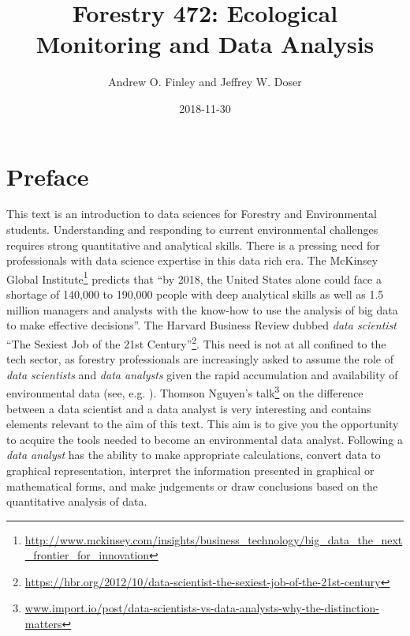 \documentclass[]{krantz}
\title{Forestry 472: Ecological Monitoring and Data Analysis}
\author{Andrew O. Finley and Jeffrey W. Doser}
\date{2018-11-30}
\renewcommand{\href}[2]{#2\footnote{\url{#1}}}
\theoremstyle{definition}
\theoremstyle{definition}
\theoremstyle{definition}
\theoremstyle{remark}
\begin{document}
\maketitle


\thispagestyle{empty}

\setlength{\abovedisplayskip}{-5pt}
\setlength{\abovedisplayshortskip}{-5pt}

\mainmatter

{
\hypersetup{linkcolor=black}
\setcounter{tocdepth}{2}
\tableofcontents
}
\listoftables
\listoffigures
\chapter*{Preface}\label{preface}


This text is an introduction to data sciences for Forestry and
Environmental students. Understanding and responding to current
environmental challenges requires strong quantitative and analytical
skills. There is a pressing need for professionals with data science
expertise in this data rich era. The
\href{http://www.mckinsey.com/insights/business_technology/big_data_the_next_frontier_for_innovation}{McKinsey
Global Institute} predicts that ``by 2018, the United States alone could
face a shortage of 140,000 to 190,000 people with deep analytical skills
as well as 1.5 million managers and analysts with the know-how to use
the analysis of big data to make effective decisions''. The Harvard
Business Review dubbed \emph{data scientist}
\href{https://hbr.org/2012/10/data-scientist-the-sexiest-job-of-the-21st-century}{``The
Sexiest Job of the 21st Century''}. This need is not at all confined to
the tech sector, as forestry professionals are increasingly asked to
assume the role of \emph{data scientists} and \emph{data analysts} given
the rapid accumulation and availability of environmental data (see, e.g.
\citet{Schimel2015}).
\href{www.import.io/post/data-scientists-vs-data-analysts-why-the-distinction-matters}{Thomson
Nguyen's talk} on the difference between a data scientist and a data
analyst is very interesting and contains elements relevant to the aim of
this text. This aim is to give you the opportunity to acquire the tools
needed to become an environmental data analyst. Following
\citet{Bravo16} a \emph{data analyst} has the ability to make
appropriate calculations, convert data to graphical representation,
interpret the information presented in graphical or mathematical forms,
and make judgements or draw conclusions based on the quantitative
analysis of data.
\end{document}
